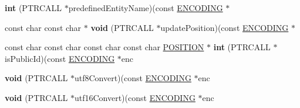 \begin{DoxyCompactItemize}
\mbox{\label{structencoding_ad6e499c3d355096e9de13217dd90747b}} 
{\bfseries int} (P\+T\+R\+C\+A\+LL $\ast$predefined\+Entity\+Name)(const \mbox{\hyperlink{structencoding}{E\+N\+C\+O\+D\+I\+NG}} $\ast$
\item 
\mbox{\label{structencoding_ace1e68c54960a8b21f2d8d1ff04ba4f5}} 
const char const char $\ast$ {\bfseries void} (P\+T\+R\+C\+A\+LL $\ast$update\+Position)(const \mbox{\hyperlink{structencoding}{E\+N\+C\+O\+D\+I\+NG}} $\ast$
\item 
\mbox{\label{structencoding_ae900a736a1f991333fd4223adb1abc53}} 
const char const char const char const char \mbox{\hyperlink{structposition}{P\+O\+S\+I\+T\+I\+ON}} $\ast$ {\bfseries int} (P\+T\+R\+C\+A\+LL $\ast$is\+Public\+Id)(const \mbox{\hyperlink{structencoding}{E\+N\+C\+O\+D\+I\+NG}} $\ast$enc
\item 
\mbox{\label{structencoding_a3fdd1f3fb0b6ab3abd7fd9ba5f13ae2a}} 
{\bfseries void} (P\+T\+R\+C\+A\+LL $\ast$utf8\+Convert)(const \mbox{\hyperlink{structencoding}{E\+N\+C\+O\+D\+I\+NG}} $\ast$enc
\item 
\mbox{\label{structencoding_a24ca2fe42f1f54cbe40aeaca5770e6f1}} 
{\bfseries void} (P\+T\+R\+C\+A\+LL $\ast$utf16\+Convert)(const \mbox{\hyperlink{structencoding}{E\+N\+C\+O\+D\+I\+NG}} $\ast$enc
\end{DoxyCompactItemize}
